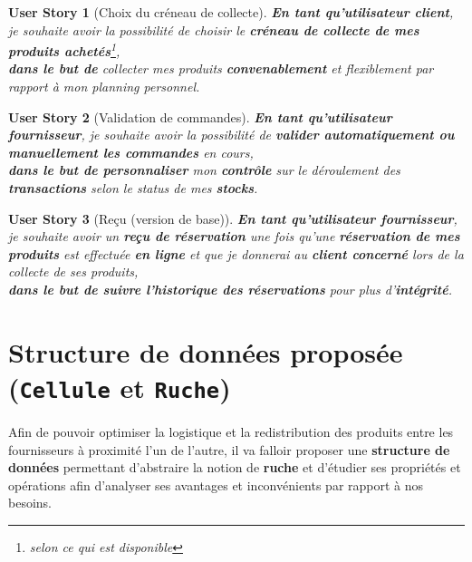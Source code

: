 \documentclass[a4paper,12pt]{report}
\theoremstyle{break}
\newtheorem*{userStory}{User Story}
\theoremstyle{break}
\theoremstyle{break}
\theoremstyle{break}
\theoremstyle{definition}
\theoremstyle{remark}
\begin{document}
\begin{userStory}[Choix du créneau de collecte]
\textbf{En tant qu'utilisateur {\color{green}client}}, je souhaite avoir la possibilité de choisir le \textbf{créneau de collecte de mes produits achetés}\footnote{selon ce qui est disponible},\\
\indent
\textbf{dans le but de} collecter mes produits \textbf{convenablement} et flexiblement par rapport à mon planning personnel.
\end{userStory}

\begin{userStory}[Validation de commandes]
\textbf{En tant qu'utilisateur {\color{red}fournisseur}}, je souhaite avoir la possibilité de \textbf{valider automatiquement ou manuellement les commandes} en cours,\\
\indent
\textbf{dans le but de personnaliser} mon \textbf{contrôle} sur le déroulement des \textbf{transactions} selon le status de mes \textbf{stocks}.
\end{userStory}

\begin{userStory}[Reçu (version de base)]
\textbf{En tant qu'utilisateur {\color{red}fournisseur}}, je souhaite avoir un \textbf{reçu de réservation} une fois qu'une \textbf{réservation de mes produits} est effectuée \textbf{en ligne} et que je donnerai au \textbf{{\color{green}client} concerné} lors de la collecte de ses produits,\\
\indent
\textbf{dans le but de suivre l'historique des réservations} pour plus d'\textbf{intégrité}.
\end{userStory}
\section{Structure de données proposée (\texttt{Cellule} et \texttt{Ruche})}
\label{sec:sd}
Afin de pouvoir optimiser la logistique et la redistribution des produits entre les fournisseurs à proximité l'un de l'autre, il va falloir proposer une \textbf{structure de données} permettant d'abstraire la notion de \textbf{ruche} et d'étudier ses propriétés et opérations afin d'analyser ses avantages et inconvénients par rapport à nos besoins.
\end{document}
